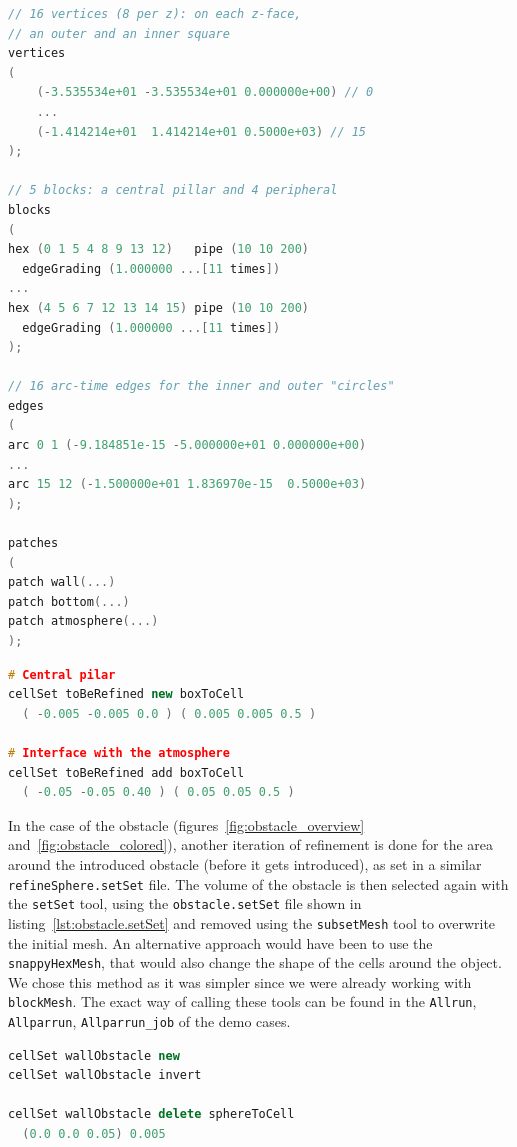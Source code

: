 \documentclass[11pt, a4paper, twoside]{article}
\begin{document}
\begin{lstlisting}[language=C++, caption={Fraction of the \texttt{blockMeshDict} used in the main case.}, label={lst:blockMeshDict}]
// 16 vertices (8 per z): on each z-face, 
// an outer and an inner square
vertices
(
    (-3.535534e+01 -3.535534e+01 0.000000e+00) // 0
    ...
    (-1.414214e+01  1.414214e+01 0.5000e+03) // 15
);

// 5 blocks: a central pillar and 4 peripheral
blocks
(
hex (0 1 5 4 8 9 13 12)   pipe (10 10 200) 
  edgeGrading (1.000000 ...[11 times])
...
hex (4 5 6 7 12 13 14 15) pipe (10 10 200) 
  edgeGrading (1.000000 ...[11 times])
);

// 16 arc-time edges for the inner and outer "circles"
edges
(
arc 0 1 (-9.184851e-15 -5.000000e+01 0.000000e+00)
...
arc 15 12 (-1.500000e+01 1.836970e-15  0.5000e+03)
);

patches
(
patch wall(...)
patch bottom(...)
patch atmosphere(...)
);
\end{lstlisting}

\begin{lstlisting}[language=C++, caption={\texttt{refine.setSet} file to select the cells to be refined.}, label={lst:refine.setSet}]
# Central pilar
cellSet toBeRefined new boxToCell 
  ( -0.005 -0.005 0.0 ) ( 0.005 0.005 0.5 )

# Interface with the atmosphere
cellSet toBeRefined add boxToCell 
  ( -0.05 -0.05 0.40 ) ( 0.05 0.05 0.5 )
\end{lstlisting}

In the case of the obstacle (figures~\ref{fig:obstacle_overview} and~\ref{fig:obstacle_colored}), another iteration of refinement is done for the area around the introduced obstacle (before it gets introduced), as set in a similar \texttt{refineSphere.setSet} file. The volume of the obstacle is then selected again with the \texttt{setSet} tool, using the \texttt{obstacle.setSet} file shown in listing~\ref{lst:obstacle.setSet} and removed using the \texttt{subsetMesh} tool to overwrite the initial mesh. An alternative approach would have been to use the \texttt{snappyHexMesh}, that would also change the shape of the cells around the object. We chose this method as it was simpler since we were already working with \texttt{blockMesh}. The exact way of calling these tools can be found in the \texttt{Allrun}, \texttt{Allparrun}, \texttt{Allparrun\_job} of the demo cases.

\begin{lstlisting}[language=C++, caption={\texttt{obstacle.setSet} file to select the cells to be removed (obstacle).}, label={lst:obstacle.setSet}]
cellSet wallObstacle new
cellSet wallObstacle invert

cellSet wallObstacle delete sphereToCell 
  (0.0 0.0 0.05) 0.005
\end{lstlisting}
\end{document}
